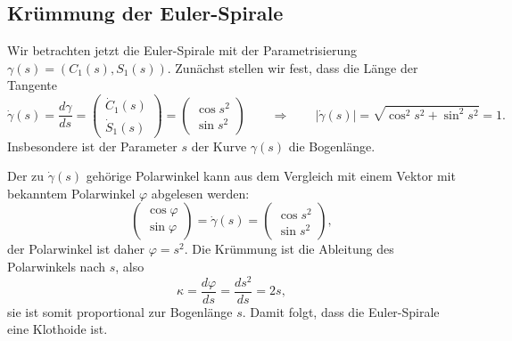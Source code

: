 \subsection{Krümmung der Euler-Spirale}
Wir betrachten jetzt die Euler-Spirale mit der Parametrisierung
$\gamma(s) = (C_1(s),S_1(s))$.
Zunächst stellen wir fest, dass die Länge der Tangente
\[
\dot{\gamma}(s)
=
\frac{d\gamma}{ds}
=
\begin{pmatrix}
\dot{C}_1(s)\\
\dot{S}_1(s)
\end{pmatrix}
=
\begin{pmatrix}
\cos s^2\\
\sin s^2
\end{pmatrix}
\qquad\Rightarrow\qquad
|\dot{\gamma}(s)|
=
\sqrt{\cos^2s^2+\sin^2s^2}
=
1.
\]
Insbesondere ist der Parameter $s$ der Kurve $\gamma(s)$ die
Bogenlänge.

Der zu $\dot{\gamma}(s)$ gehörige Polarwinkel kann aus dem Vergleich
mit einem Vektor mit bekanntem Polarwinkel $\varphi$ abgelesen werden:
\[
\begin{pmatrix}
\cos \varphi\\
\sin \varphi
\end{pmatrix}
=
\dot{\gamma}(s)
=
\begin{pmatrix}
\cos s^2\\\sin s^2
\end{pmatrix},
\]
der Polarwinkel 
ist daher $\varphi = s^2$.
Die Krümmung ist die Ableitung des Polarwinkels nach $s$, also
\[
\kappa
=
\frac{d\varphi}{ds}
=
\frac{ds^2}{ds}
=
2s,
\]
sie ist somit proportional zur Bogenlänge $s$.
Damit folgt, dass die Euler-Spirale eine Klothoide ist.

